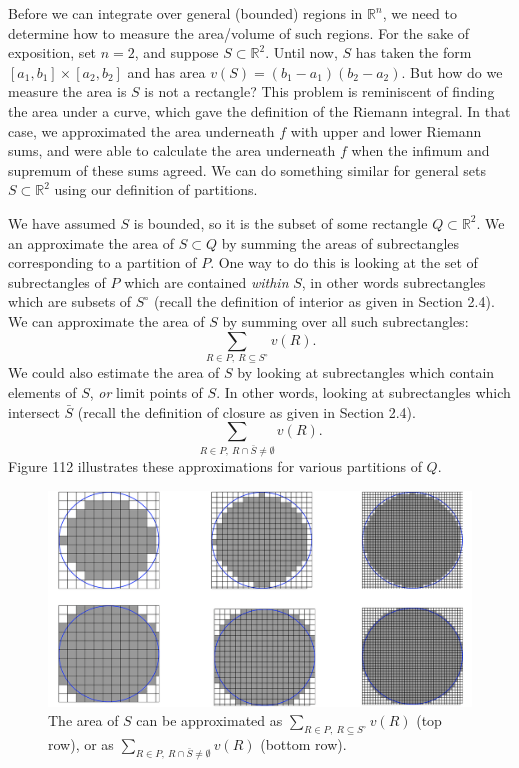 \documentclass{article}
\newcommand{\R}{\mathbb{R}}
\theoremstyle{definition}
\begin{document}
	Before we can integrate over general (bounded) regions in $ \R^n $, we need to determine how to measure the area/volume of such regions. For the sake of exposition, set $ n=2 $, and suppose $ S \subset \R^2 $. Until now, $ S $ has taken the form $ [a_1,b_1]\times [a_2,b_2] $ and has area $ v(S)=(b_1-a_1)(b_2-a_2) $. But how do we measure the area is $ S $ is not a rectangle? This problem is reminiscent of finding the area under a curve, which gave the definition of the Riemann integral. In that case, we approximated the area underneath $ f $ with upper and lower Riemann sums, and were able to calculate the area underneath $ f $ when the infimum and supremum of these sums agreed. We can do something similar for general sets $ S\subset\R^2 $ using our definition of partitions.
	
	We have assumed $ S $ is bounded, so it is the subset of some rectangle $ Q\subset\R^2 $. We an approximate the area of $ S\subset Q $ by summing the areas of subrectangles corresponding to a partition of $ P $.  One way to do this is looking at the set of subrectangles  of $ P $ which are contained \textit{within} $ S $, in other words subrectangles which are subsets of $ S^\circ $ (recall the definition of interior as given in Section 2.4). We can approximate the area of $ S $ by summing over all such subrectangles:
	$$ \sum_{R\in P,\ R\subseteq S^\circ} v(R).$$ 
	We could also estimate the area of $ S $ by looking at subrectangles which contain elements of $ S $, \textit{or} limit points of $ S $. In other words, looking at subrectangles which intersect $ \bar S $ (recall the definition of closure as given in Section 2.4).
	$$ \sum_{R\in P,\ R\cap \bar S\neq \emptyset}v(R).$$ Figure 112 illustrates these approximations for various partitions of $ Q $.
	\begin{figure}[h!]
		\centering
		\includegraphics[width=1\linewidth]{figures/jordan_content}
		\caption{The area of $ S $ can be approximated as $ \sum_{R\in P,\ R\subseteq S^\circ} v(R)$ (top row), or as $ \sum_{R\in P,\ R\cap \bar S\neq \emptyset}v(R)$ (bottom row). }
		\label{fig:jordancontent}
	\end{figure}
	
\end{document}
